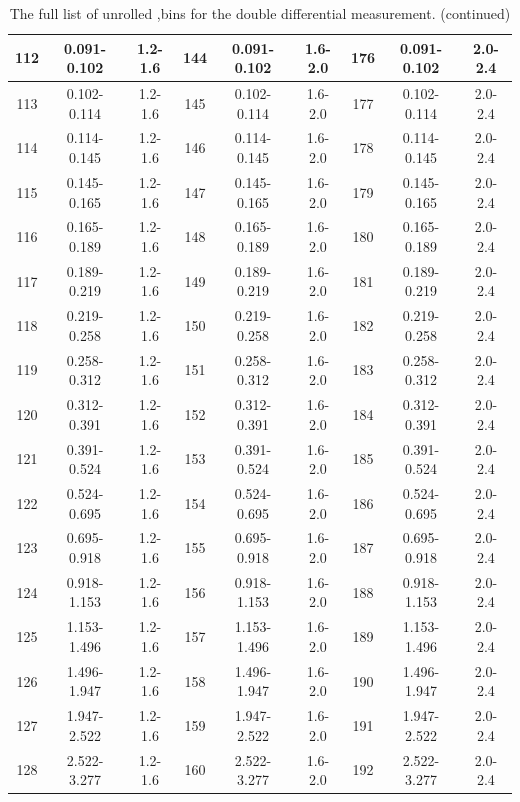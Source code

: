 \begin{table}[!p]
\begin{center}
\begin{tabular}{|c|c|c|c|c|c|c|c|c|}
112 & 0.091-0.102  & 1.2-1.6 & 144 & 0.091-0.102  & 1.6-2.0 & 176 & 0.091-0.102 & 2.0-2.4   \\ \hline         
113 & 0.102-0.114  & 1.2-1.6 & 145 & 0.102-0.114  & 1.6-2.0 & 177 & 0.102-0.114 & 2.0-2.4   \\ \hline         
114 & 0.114-0.145  & 1.2-1.6 & 146 & 0.114-0.145  & 1.6-2.0 & 178 & 0.114-0.145 & 2.0-2.4   \\ \hline         
115 & 0.145-0.165  & 1.2-1.6 & 147 & 0.145-0.165  & 1.6-2.0 & 179 & 0.145-0.165 & 2.0-2.4   \\ \hline         
116 & 0.165-0.189  & 1.2-1.6 & 148 & 0.165-0.189  & 1.6-2.0 & 180 & 0.165-0.189 & 2.0-2.4   \\ \hline         
117 & 0.189-0.219  & 1.2-1.6 & 149 & 0.189-0.219  & 1.6-2.0 & 181 & 0.189-0.219 & 2.0-2.4   \\ \hline         
118 & 0.219-0.258  & 1.2-1.6 & 150 & 0.219-0.258  & 1.6-2.0 & 182 & 0.219-0.258 & 2.0-2.4   \\ \hline         
119 & 0.258-0.312  & 1.2-1.6 & 151 & 0.258-0.312  & 1.6-2.0 & 183 & 0.258-0.312 & 2.0-2.4   \\ \hline         
120 & 0.312-0.391  & 1.2-1.6 & 152 & 0.312-0.391  & 1.6-2.0 & 184 & 0.312-0.391 & 2.0-2.4   \\ \hline         
121 & 0.391-0.524  & 1.2-1.6 & 153 & 0.391-0.524  & 1.6-2.0 & 185 & 0.391-0.524 & 2.0-2.4   \\ \hline         
122 & 0.524-0.695  & 1.2-1.6 & 154 & 0.524-0.695  & 1.6-2.0 & 186 & 0.524-0.695 & 2.0-2.4   \\ \hline         
123 & 0.695-0.918  & 1.2-1.6 & 155 & 0.695-0.918  & 1.6-2.0 & 187 & 0.695-0.918 & 2.0-2.4   \\ \hline         
124 & 0.918-1.153  & 1.2-1.6 & 156 & 0.918-1.153  & 1.6-2.0 & 188 & 0.918-1.153 & 2.0-2.4   \\ \hline         
125 & 1.153-1.496  & 1.2-1.6 & 157 & 1.153-1.496  & 1.6-2.0 & 189 & 1.153-1.496 & 2.0-2.4   \\ \hline         
126 & 1.496-1.947  & 1.2-1.6 & 158 & 1.496-1.947  & 1.6-2.0 & 190 & 1.496-1.947 & 2.0-2.4   \\ \hline         
127 & 1.947-2.522  & 1.2-1.6 & 159 & 1.947-2.522  & 1.6-2.0 & 191 & 1.947-2.522 & 2.0-2.4   \\ \hline
128 & 2.522-3.277  & 1.2-1.6 & 160 & 2.522-3.277  & 1.6-2.0 & 192 & 2.522-3.277 & 2.0-2.4   \\ \hline



\end{tabular}
\end{center}
\caption[Other half of the 2D bin definitions]{The full list of unrolled \phistar,\rapidity bins for the double differential measurement. (continued) }
\label{table:phistarAndEtaBins2}
\end{table}





